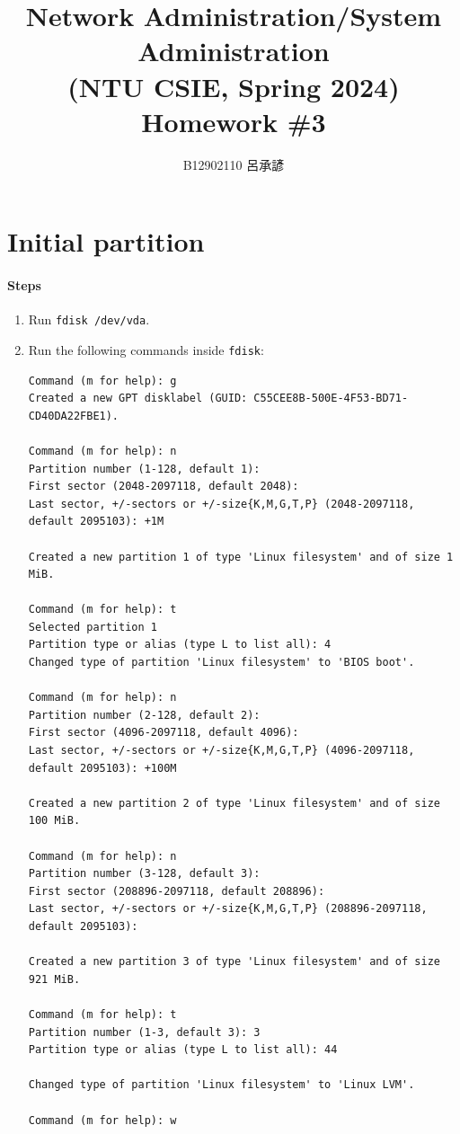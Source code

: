 \documentclass[12pt, a4paper]{article}
\title{
  Network Administration/System Administration\\
  (NTU CSIE, Spring 2024)\\
  Homework \#3
}
\author{\Large B12902110 呂承諺}
\date{}
\begin{document}
  \maketitle

  \section{Initial partition}
  \paragraph{Steps}
  \begin{enumerate}
    \item Run \verb|fdisk /dev/vda|.
    \item Run the following commands inside \verb|fdisk|:
    \begin{footnotesize}
      \begin{verbatim}
Command (m for help): g
Created a new GPT disklabel (GUID: C55CEE8B-500E-4F53-BD71-CD40DA22FBE1).

Command (m for help): n
Partition number (1-128, default 1):
First sector (2048-2097118, default 2048):
Last sector, +/-sectors or +/-size{K,M,G,T,P} (2048-2097118, default 2095103): +1M

Created a new partition 1 of type 'Linux filesystem' and of size 1 MiB.

Command (m for help): t
Selected partition 1
Partition type or alias (type L to list all): 4
Changed type of partition 'Linux filesystem' to 'BIOS boot'.

Command (m for help): n
Partition number (2-128, default 2):
First sector (4096-2097118, default 4096):
Last sector, +/-sectors or +/-size{K,M,G,T,P} (4096-2097118, default 2095103): +100M

Created a new partition 2 of type 'Linux filesystem' and of size 100 MiB.

Command (m for help): n
Partition number (3-128, default 3):
First sector (208896-2097118, default 208896):
Last sector, +/-sectors or +/-size{K,M,G,T,P} (208896-2097118, default 2095103):

Created a new partition 3 of type 'Linux filesystem' and of size 921 MiB.

Command (m for help): t
Partition number (1-3, default 3): 3
Partition type or alias (type L to list all): 44

Changed type of partition 'Linux filesystem' to 'Linux LVM'.

Command (m for help): w\end{verbatim}
    \end{footnotesize}
  \end{enumerate}
\end{document}
